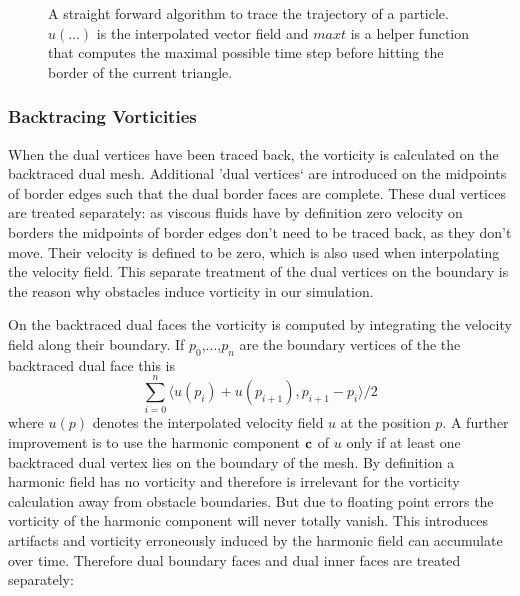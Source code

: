 \begin{figure}
\begin{center}
\end{center}
\caption{A straight forward algorithm to trace  the trajectory of a particle. $u(...)$ is the interpolated vector field and $maxt$ is a helper function that computes the maximal possible time step before hitting the border of the current triangle.}
\label{fig:fd_pathtracing}
\end{figure}

\subsubsection{Backtracing Vorticities}

When the dual vertices have been traced back, the vorticity is calculated on the backtraced dual mesh. Additional 'dual vertices` are introduced on the midpoints of border edges such that the dual border faces are complete. These dual vertices are treated separately: as viscous fluids have by definition zero velocity on borders the midpoints of border edges don't need to be traced back, as they don't move. Their velocity is defined to be zero, which is also used when interpolating the velocity field. This separate treatment of the dual vertices on the boundary is the reason why obstacles induce vorticity in our simulation. 

On the backtraced dual faces the vorticity is computed by integrating the velocity field along their boundary. If $p_0$,...,$p_n$ are the boundary vertices of the the backtraced dual face this is
\[\sum_{i=0}^n\langle u(p_i) + u(p_{i+1}), p_{i+1}-p_{i}\rangle/2\]
where $u(p)$ denotes the interpolated velocity field $u$ at the position $p$. A further improvement is to use the harmonic component $\textbf{c}$ of $u$ only if at least one backtraced  dual vertex lies on the boundary of the mesh. By definition a harmonic field has no vorticity and therefore is irrelevant for the vorticity calculation away from obstacle boundaries. But due to floating point errors the vorticity of the harmonic component will never totally vanish. This introduces artifacts and vorticity erroneously induced by the harmonic field can accumulate over time. Therefore dual boundary faces and dual inner faces are treated separately:

